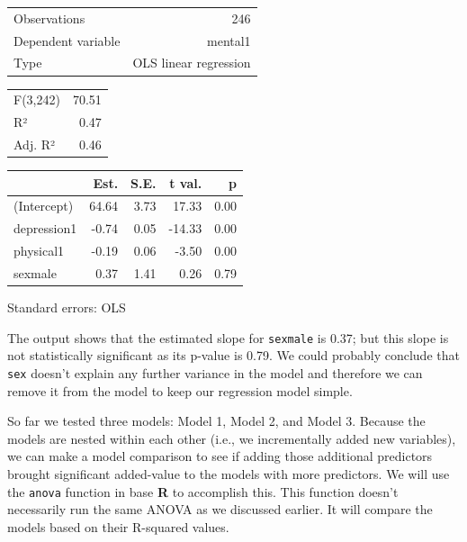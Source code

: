 \documentclass[]{book}
\begin{document}
\begin{table}[!h]
\centering
\begin{tabular}{lr}
\toprule
\rowcolor{gray!6}  Observations & 246\\
Dependent variable & mental1\\
\rowcolor{gray!6}  Type & OLS linear regression\\
\bottomrule
\end{tabular}
\end{table} \begin{table}[!h]
\centering
\begin{tabular}{lr}
\toprule
\rowcolor{gray!6}  F(3,242) & 70.51\\
R² & 0.47\\
\rowcolor{gray!6}  Adj. R² & 0.46\\
\bottomrule
\end{tabular}
\end{table} \begin{table}[!h]
\centering
\begin{threeparttable}
\begin{tabular}{lrrrr}
\toprule
  & Est. & S.E. & t val. & p\\
\midrule
\rowcolor{gray!6}  (Intercept) & 64.64 & 3.73 & 17.33 & 0.00\\
depression1 & -0.74 & 0.05 & -14.33 & 0.00\\
\rowcolor{gray!6}  physical1 & -0.19 & 0.06 & -3.50 & 0.00\\
sexmale & 0.37 & 1.41 & 0.26 & 0.79\\
\bottomrule
\end{tabular}
\begin{tablenotes}
\item Standard errors: OLS
\end{tablenotes}
\end{threeparttable}
\end{table}

The output shows that the estimated slope for \texttt{sexmale} is 0.37; but this slope is not statistically significant as its p-value is 0.79. We could probably conclude that \texttt{sex} doesn't explain any further variance in the model and therefore we can remove it from the model to keep our regression model simple.

So far we tested three models: Model 1, Model 2, and Model 3. Because the models are nested within each other (i.e., we incrementally added new variables), we can make a model comparison to see if adding those additional predictors brought significant added-value to the models with more predictors. We will use the \texttt{anova} function in base \textbf{R} to accomplish this. This function doesn't necessarily run the same ANOVA as we discussed earlier. It will compare the models based on their R-squared values.
\end{document}
